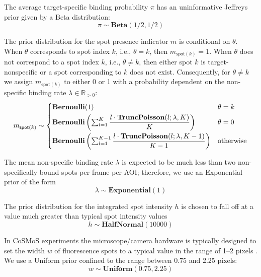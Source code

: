 The average target-specific binding probability $\pi$ has an uninformative Jeffreys prior \citep{Gelman2013-ro} given by a Beta distribution:
%
\begin{equation}
    \pi \sim \mathbf{Beta}(1/2, 1/2)
\end{equation}

The prior distribution for the spot presence indicator $m$ is conditional on $\theta$. When $\theta$ corresponds to spot index $k$, i.e., $\theta = k$, then $m_{\mathsf{spot}(k)} = 1$. When $\theta$ does not correspond to a spot index $k$, i.e., $\theta \neq k$, then either spot $k$ is target-nonspecific or a spot corresponding to $k$ does not exist. Consequently, for $\theta \neq k$ we assign $m_{\mathsf{spot}(k)}$ to either 0 or 1 with a probability dependent on the non-specific binding rate $\lambda \in \mathbb{R}_{>0}$:
%
\begin{equation}
    m_{\mathsf{spot}(k)} \sim
    \begin{cases}
        \mathbf{Bernoulli}(1) & \text{$\theta = k$} \\
        \mathbf{Bernoulli} \left( \sum_{l=1}^K \dfrac{l \cdot \mathbf{TruncPoisson}(l; \lambda, K)}{K} \right) & \text{$\theta = 0$} \rule{0pt}{4ex} \\
        \mathbf{Bernoulli} \left( \sum_{l=1}^{K-1} \dfrac{l \cdot \mathbf{TruncPoisson}(l; \lambda, K-1)}{K-1} \right) & \text{otherwise} \rule{0pt}{4ex}
    \end{cases}
\end{equation}

The mean non-specific binding rate $\lambda$ is expected to be much less than two non-specifically bound spots per frame per AOI; therefore, we use an Exponential prior of the form
%
\begin{equation}
    \lambda \sim \mathbf{Exponential}(1)
\end{equation}

The prior distribution for the integrated spot intensity $h$ is chosen to fall off at a value much greater than typical spot intensity values 
%
\begin{equation}
    h \sim \mathbf{HalfNormal}(10000)
\end{equation}

In CoSMoS experiments the microscope/camera hardware is typically designed to set the width $w$ of fluorescence spots to a  typical value in the range of 1--2 pixels \citep{Ober2015-ba}. We use a Uniform prior confined to the range between 0.75 and 2.25 pixels:
%
\begin{equation}
    w \sim \mathbf{Uniform}(0.75, 2.25)
\end{equation}

